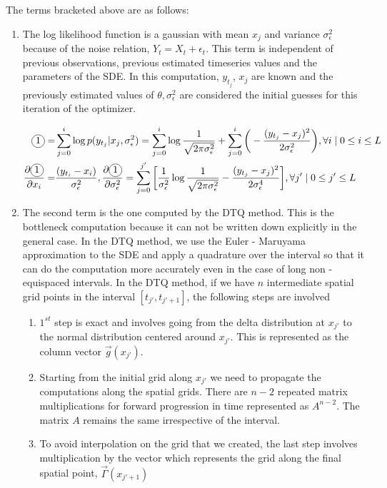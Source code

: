 \documentclass[a4paper,11pt]{article}
\newcommand\encircle[1]{%
\tikz[baseline=(X.base)]
\node (X) [draw, shape=circle, inner sep=0] {\strut #1};}
\begin{document}
The terms bracketed above are as follows:
\begin{enumerate}
\item The log likelihood function is a gaussian with mean $x_j$ and variance $\sigma^2_{\epsilon}$ because of the noise relation, $Y_t = X_t + {\epsilon}_t$. This term is independent of previous observations, previous estimated timeseries values and the parameters of the SDE. In this computation, $y_{t_{j}}$, $x_{j}$ are known and the previously estimated values of $\theta, \sigma^2_{\epsilon}$ are considered the initial guesses for this iteration of the optimizer.

\begin{align*}
\encircle{1} = & \sum_{j=0}^{i} \log p(y_{t_{j}} | x_j, \sigma^2_{\epsilon}) = \sum_{j=0}^{i} \log \frac{1}{\sqrt{2 \pi \sigma^2_{\epsilon}}} + \sum_{j=0}^{i} \bigg( -\frac{(y_{t_{j}} - x_j)^2}{2 \sigma^2_{\epsilon}}\bigg), \forall i \mid 0 \leq i \leq L \\
\frac{\partial \encircle{1}}{\partial x_{i}} = & \frac{(y_{t_{i}} - x_{i})}{\sigma^2_{\epsilon}}, \frac{\partial \encircle{1}}{\partial \sigma^2_{\epsilon}} = \sum_{j=0}^{j'} \bigg[ \frac{1}{\sigma^2_{\epsilon}} \log \frac{1}{\sqrt{2 \pi \sigma^2_{\epsilon}}} - \frac{(y_{t_j} - x_j)^2}{2\sigma^4_{\epsilon}} \bigg], \forall j' \mid 0 \leq j' \leq L
\end{align*}

\item The second term is the one computed by the DTQ method. This is the bottleneck computation because it can not be written down explicitly in the general case. In the DTQ method, we use the Euler - Maruyama approximation to the SDE and apply a quadrature over the interval so that it can do the computation more accurately even in the case of long non - equispaced intervals. In the DTQ method, if we have $n$ intermediate spatial grid points in the interval $[t_{j'}, t_{j'+1}]$, the following steps are involved

\begin{enumerate}
\item $1^{st}$ step is exact and involves going from the delta distribution at $x_{j'}$ to the normal distribution centered around $x_{j'}$. This is represented as the column vector $\vec{g}(x_{j'})$.
\item Starting from the initial grid along $x_{j'}$ we need to propagate the computations along the spatial grids. There are $n - 2$ repeated matrix multiplications for forward progression in time represented as $A^{n - 2}$. The matrix $A$ remains the same irrespective of the interval.
\item To avoid interpolation on the grid that we created, the last step involves multiplication by the vector which represents the grid along the final spatial point, $\vec{\Gamma}(x_{j'+1})$
\end{enumerate}


\end{enumerate}
\end{document}
